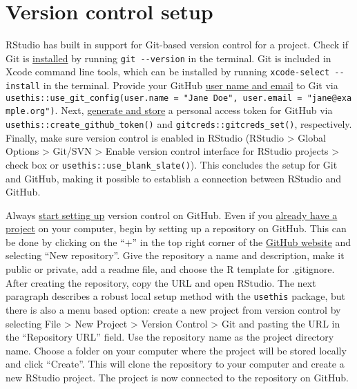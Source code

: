 \documentclass[
  letterpaper,
  DIV=11,
  numbers=noendperiod]{scrreport}
\begin{document}
\section{Version control setup}\label{version-control-setup}

RStudio has built in support for Git-based version control for a
project. Check if Git is
\href{https://happygitwithr.com/install-git}{installed} by running
\texttt{git\ -\/-version} in the terminal. Git is included in Xcode
command line tools, which can be installed by running
\texttt{xcode-select\ -\/-install} in the terminal. Provide your GitHub
\href{https://happygitwithr.com/hello-git}{user name and email} to Git
via
\texttt{usethis::use\_git\_config(user.name\ =\ "Jane\ Doe",\ user.email\ =\ "jane@example.org")}.
Next, \href{https://happygitwithr.com/https-pat\#tldr}{generate and
store} a personal access token for GitHub via
\texttt{usethis::create\_github\_token()} and
\texttt{gitcreds::gitcreds\_set()}, respectively. Finally, make sure
version control is enabled in RStudio (RStudio \textgreater{} Global
Options \textgreater{} Git/SVN \textgreater{} Enable version control
interface for RStudio projects \textgreater{} check box or
\texttt{usethis::use\_blank\_slate()}). This concludes the setup for Git
and GitHub, making it possible to establish a connection between RStudio
and GitHub.

Always \href{https://happygitwithr.com/new-github-first}{start setting
up} version control on GitHub. Even if you
\href{https://happygitwithr.com/existing-github-first}{already have a
project} on your computer, begin by setting up a repository on GitHub.
This can be done by clicking on the ``+'' in the top right corner of the
\href{https://github.com}{GitHub website} and selecting ``New
repository''. Give the repository a name and description, make it public
or private, add a readme file, and choose the R template for .gitignore.
After creating the repository, copy the URL and open RStudio. The next
paragraph describes a robust local setup method with the
\texttt{usethis} package, but there is also a menu based option: create
a new project from version control by selecting File \textgreater{} New
Project \textgreater{} Version Control \textgreater{} Git and pasting
the URL in the ``Repository URL'' field. Use the repository name as the
project directory name. Choose a folder on your computer where the
project will be stored locally and click ``Create''. This will clone the
repository to your computer and create a new RStudio project. The
project is now connected to the repository on GitHub.
\end{document}
